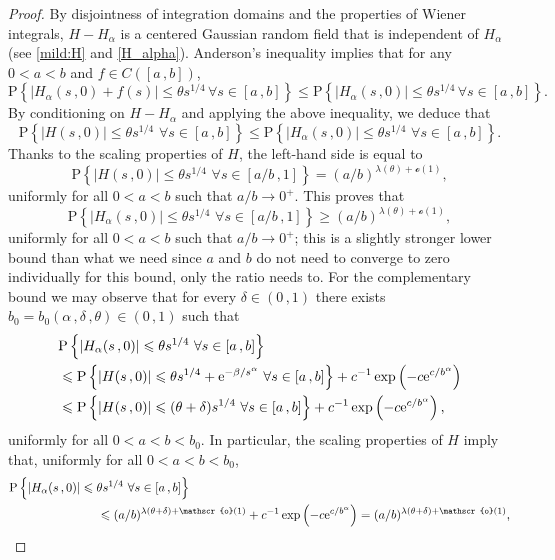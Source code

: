 \documentclass[reqno]{amsart}
\newcommand{\<}{\langle}
\renewcommand{\>}{\rangle}
\renewcommand{\P}{\mathrm{P}}
\newcommand{\1}{\mathbb{1}}
\newcommand{\e}{{\rm e}}
\renewcommand{\ge}{\geqslant}
\renewcommand{\le}{\leqslant}
\theoremstyle{definition}
\numberwithin{equation}{section}
\begin{document}
\begin{proof}
	By disjointness of integration domains and the properties of Wiener 
	integrals, $H - H_\alpha$ is a centered Gaussian random field that is independent
	of $H_\alpha$ (see \eqref{mild:H} and \eqref{H_alpha}).
	Anderson's inequality \cite{Anderson} implies that for any $0<a<b$ and $f \in C([a\,,b])$,
	\[
		\P\left\{ |H_\alpha(s\,,0) + f(s)| \le \theta s^{1/4} \, 
		\forall s \in [a\,,b] \right\} \le \P\left\{ |H_\alpha(s\,,0)| 
		\le \theta s^{1/4} \, \forall s \in [a\,,b] \right\}.
	\]
	By conditioning on $H-H_\alpha$ and applying the above inequality, we deduce that
	\[
		\P\left\{ |H(s\,,0)|\le \theta s^{1/4}\,\,\forall s\in[a\,,b]\right\}
		\le\P\left\{ |H_\alpha(s\,,0)|\le \theta s^{1/4}\,\,\forall s\in[a\,,b]\right\}.
	\]
	Thanks to the scaling properties of $H$, the left-hand side is equal to
	\[
		\P\left\{ |H(s\,,0)|\le \theta s^{1/4}\,\,\forall s\in[a/b\,,1]\right\}
		=(a/b)^{\lambda(\theta)+\mathscr{o}(1)},
	\]
	uniformly for all $0<a<b$ such that $a/b\to0^+$. This proves that
	\begin{equation}\label{HHLB}
		\P\left\{ |H_\alpha(s\,,0)|\le \theta s^{1/4}\,\,\forall s\in[a/b\,,1]\right\}
		\ge (a/b)^{\lambda(\theta)+\mathscr{o}(1)},
	\end{equation}
	uniformly for all $0<a<b$ such that $a/b\to0^+$; this is a slightly stronger
	lower bound than what we need since $a$ and $b$ do not need to converge to zero 
	individually for this bound, only the ratio needs to. For the complementary bound
	we may observe that for every $\delta\in(0\,,1)$
	there exists $b_0 = b_0(\alpha\,,\delta\,,\theta)\in(0\,,1)$ such that
	\begin{align*}
		&\P\left\{ |H_\alpha(s\,,0)|\le \theta s^{1/4}\,\,\forall s\in[a\,,b]\right\}\\
			&\le \P\left\{ |H(s\,,0)|\le \theta s^{1/4} + 
			\e^{-\beta/s^\alpha}\,\,\forall s\in[a\,,b]\right\}
			+ c^{-1}\exp\left(-c\e^{c/b^\alpha}\right)\\
		&\le \P\left\{ |H(s\,,0)|\le (\theta+\delta) s^{1/4}\,\,\forall s\in[a\,,b]\right\}
			+ c^{-1}\exp\left(-c\e^{c/b^\alpha}\right),
	\end{align*}
	uniformly for all $0<a<b<b_0$. In particular, the scaling properties of
	$H$ imply that, uniformly for all $0<a<b<b_0$,
	\begin{align*}
		&\P\left\{ |H_\alpha(s\,,0)|\le \theta s^{1/4}\,\,\forall s\in[a\,,b]\right\}\\
		&\hskip1in
			\le (a/b)^{\lambda(\theta+\delta)+\mathscr{o}(1)}
			+ c^{-1}\exp\left(-c\e^{c/b^\alpha}\right)= (a/b)^{\lambda(\theta+\delta)+\mathscr{o}(1)},

\end{align*}
\end{proof}
\end{document}
